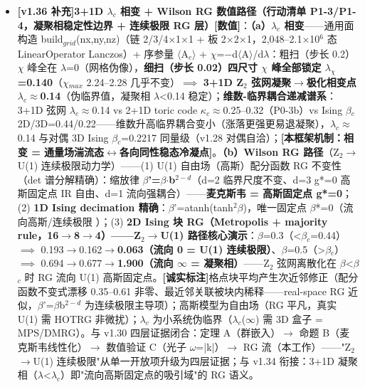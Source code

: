 \documentclass[UTF8,fontset=windows]{csoarticle}
\newcommand{\mtag}[1]{\textbf{[#1]}}
\newcommand{\up}[1]{\ensuremath{^{#1}}}
\newcommand{\down}[1]{\ensuremath{_{#1}}}
\begin{document}
\begin{itemize}
\item \textbf{\mtag{v1.36 补充}3+1D \ensuremath{\lambda}\down{c} 相变 + Wilson RG 数值路径（行动清单 P1-3/P1-4，凝聚相稳定性边界 + 连续极限 RG 层）}\mtag{数值}：\textbf{（a）\ensuremath{\lambda}\down{c} 相变}------通用面构造 build\down{grid}(nx,ny,nz)（链 2/3/4\ensuremath{\times}1\ensuremath{\times}1 + 板 2\ensuremath{\times}2\ensuremath{\times}1，2,048--2.1\ensuremath{\times}10\up{6} 态 LinearOperator Lanczos）+ 序参量 \ensuremath{\langle}A\down{c}\ensuremath{\rangle} + \ensuremath{\chi}=\ensuremath{-}d\ensuremath{\langle}A\ensuremath{\rangle}/d\ensuremath{\lambda}：粗扫（步长 0.2）\ensuremath{\chi} 峰全在 \ensuremath{\lambda}=0（网格伪像），\textbf{细扫（步长 0.02）四尺寸 \ensuremath{\chi} 峰全部锁定 \ensuremath{\lambda}\down{\chi{}}=0.140}（\ensuremath{\chi}\down{max} 2.24--2.28 几乎不变）\ensuremath{\implies} \textbf{3+1D Z\down{2} 弦网凝聚\ensuremath{\to}极化相变点 \ensuremath{\lambda}\down{c}\ensuremath{\approx}0.14}（伪临界值，凝聚相 \ensuremath{\lambda}<0.14 稳定）；\textbf{维数-临界耦合递减谱系}：3+1D 弦网 \ensuremath{\lambda}\down{c}\ensuremath{\approx}0.14 vs 2+1D toric code \ensuremath{\kappa}\down{c}\ensuremath{\approx}0.25--0.32（P0-3b）vs Ising \ensuremath{\beta}\down{c} 2D/3D=0.44/0.22------维数升高临界耦合变小（涨落更强更易退凝聚），\ensuremath{\lambda}\down{c}\ensuremath{\approx}0.14 与对偶 3D Ising \ensuremath{\beta}\down{c}=0.2217 同量级（v1.28 对偶自洽）；\mtag{本框架机制：相变 = 通量场湍流态\ensuremath{\leftrightarrow}各向同性稳态冷凝点}。\textbf{（b）Wilson RG 路径}（Z\down{2}\ensuremath{\to}U(1) 连续极限动力学）------(1) U(1) 自由场（高斯）配分函数 RG 不变性（det 谱分解精确）：缩放律 \textbf{\ensuremath{\beta}'=\ensuremath{\beta}\ensuremath{\cdot}b\up{2-d}}（d=2 临界尺度不变、d=3 g*=0 高斯固定点 IR 自由、d=1 流向强耦合）------\textbf{麦克斯韦 = 高斯固定点 g*=0}；(2) \textbf{1D Ising decimation 精确}：\ensuremath{\beta}'=atanh(tanh\up{2}\ensuremath{\beta})，唯一固定点 \ensuremath{\beta}*=0（流向高斯/连续极限 \checkmark）；(3) \textbf{2D Ising 块 RG（Metropolis + majority rule，16\ensuremath{\to}8\ensuremath{\to}4）------Z\down{2}\ensuremath{\to}U(1) 路径核心演示}：\ensuremath{\beta}=0.3（<\ensuremath{\beta}\down{c}=0.44）\ensuremath{\implies} 0.193\ensuremath{\to}0.162\ensuremath{\to}\textbf{0.063（流向 0 = U(1) 连续极限）}、\ensuremath{\beta}=0.5（>\ensuremath{\beta}\down{c}）\ensuremath{\implies} 0.694\ensuremath{\to}0.677\ensuremath{\to}\textbf{1.900（流向 \ensuremath{\infty} = 凝聚相）}------Z\down{2} 弦网离散化在 \ensuremath{\beta}<\ensuremath{\beta}\down{c} 时 RG 流向 U(1) 高斯固定点。\mtag{诚实标注}格点块平均产生次近邻修正（配分函数不变式漂移 0.35--0.61 非零、最近邻关联被块内稀释------real-space RG 近似，\ensuremath{\beta}'=\ensuremath{\beta}b\up{2-d} 为连续极限主导项）；高斯模型为自由场（RG 平凡，真实 U(1) 需 HOTRG 非微扰）；\ensuremath{\lambda}\down{c} 为小系统伪临界（\ensuremath{\lambda}\down{c}(\ensuremath{\infty}) 需 3D 盒子 = MPS/DMRG）。与 v1.30 四层证据闭合：定理 A（群嵌入）\ensuremath{\to} 命题 B（麦克斯韦线性化）\ensuremath{\to} 数值验证 C（光子 \ensuremath{\omega}=|k|）\ensuremath{\to} RG 流（本工作）------"Z\down{2}\ensuremath{\to}U(1) 连续极限"从单一开放项升级为四层证据；与 v1.34 衔接：3+1D 凝聚相（\ensuremath{\lambda}<\ensuremath{\lambda}\down{c}）即"流向高斯固定点的吸引域"的 RG 语义。

\end{itemize}
\end{document}
